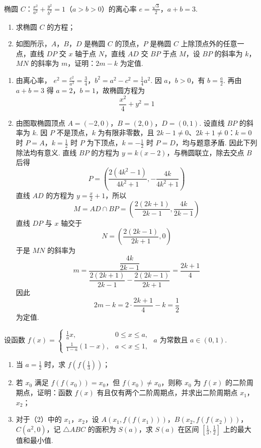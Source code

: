 \begin{problem}
椭圆 \(C\)：\(\frac{x^2}{a^2} + \frac{y^2}{b^2} = 1\)（\(a > b > 0\)）的离心率 \(e = \frac{\sqrt{3}}{2}\)，\(a + b = 3\).
\begin{enumerate}
\item 求椭圆 \(C\) 的方程；
\item 如图所示，\(A\)，\(B\)，\(D\) 是椭圆 \(C\) 的顶点，\(P\) 是椭圆 \(C\) 上除顶点外的任意一点，直线 \(DP\) 交 \(x\) 轴于点 \(N\)，直线 \(AD\) 交 \(BP\) 于点 \(M\)，设 \(BP\) 的斜率为 \(k\)，\(MN\) 的斜率为 \(m\)，证明：\(2m-k\) 为定值.
\end{enumerate}
\end{problem}

\begin{solution}
\begin{enumerate}
\item 由离心率，
\(e^{2}=\frac{c^{2}}{a^{2}}=\frac34\)，\(b^{2}=a^{2}-c^{2}=\frac14a^{2}\).
因 \(a\)，\(b>0\)，有 \(b=\frac a2\). 再由 \(a+b=3\) 得 \(a=2\)，\(b=1\)，故椭圆方程为
\[
\frac{x^{2}}4+y^{2}=1
\]
\item 由图取椭圆顶点 \(A=(-2,0)\)，\(B=(2,0)\)，\(D=(0,1)\). 设直线 \(BP\) 的斜率为 \(k\). 因 \(P\) 不是顶点，\(k\) 为有限非零数，且 \(2k-1\ne0\)、\(2k+1\ne0\)：\(k=0\) 时 \(P=A\)，\(k=\frac12\) 时 \(P\) 为下顶点，\(k=-\frac12\) 时 \(P=D\)，均与题意矛盾. 因此下列除法均有意义. 直线 \(BP\) 的方程为 \(y=k(x-2)\)，与椭圆联立，除去交点 \(B\) 后得
\[
P=\left(\frac{2(4k^{2}-1)}{4k^{2}+1},-\frac{4k}{4k^{2}+1}\right)
\]
直线 \(AD\) 的方程为 \(y=\frac x2+1\)，所以
\[
M=AD\cap BP=\left(\frac{2(2k+1)}{2k-1},\frac{4k}{2k-1}\right)
\]
直线 \(DP\) 与 \(x\) 轴交于
\[
N=\left(\frac{2(2k-1)}{2k+1},0\right)
\]
于是 \(MN\) 的斜率为
\[
m=\frac{\dfrac{4k}{2k-1}}{\dfrac{2(2k+1)}{2k-1}-\dfrac{2(2k-1)}{2k+1}}
 =\frac{2k+1}{4}
\]
因此
\[
2m-k=2\cdot\frac{2k+1}{4}-k=\frac12
\]
为定值.
\end{enumerate}
\end{solution}

\begin{problem}
设函数 \( f(x) = \begin{cases}
\frac{1}{a} x, & 0 \leqslant x \leqslant a,\\
\frac{1}{1 - a} (1 - x), & a < x \leqslant 1,
\end{cases} \) \( a \) 为常数且 \( a \in (0,1) \).
\begin{enumerate}
\item 当 \(a = \frac{1}{2}\) 时，求 \(f\left(f\left(\frac{1}{3}\right)\right)\)；
\item 若 \(x_0\) 满足 \(f(f(x_0)) = x_0\)，但 \(f(x_0) \neq x_0\)，则称 \(x_0\) 为 \(f(x)\) 的二阶周期点，证明：函数 \(f(x)\) 有且仅有两个二阶周期点，并求出二阶周期点 \(x_1\)，\(x_2\)；
\item 对于（2）中的 \(x_{1}\)，\(x_{2}\)，设 \(A\left(x_{1}, f(f(x_{1}))\right)\)，\(B\left(x_{2}, f(f(x_{2}))\right)\)，\(C\left(a^{2}, 0\right)\)，记 \(\triangle ABC\) 的面积为 \(S(a)\)，求 \(S(a)\) 在区间 \(\left[\frac{1}{3}, \frac{1}{2}\right]\) 上的最大值和最小值.
\end{enumerate}
\end{problem}

